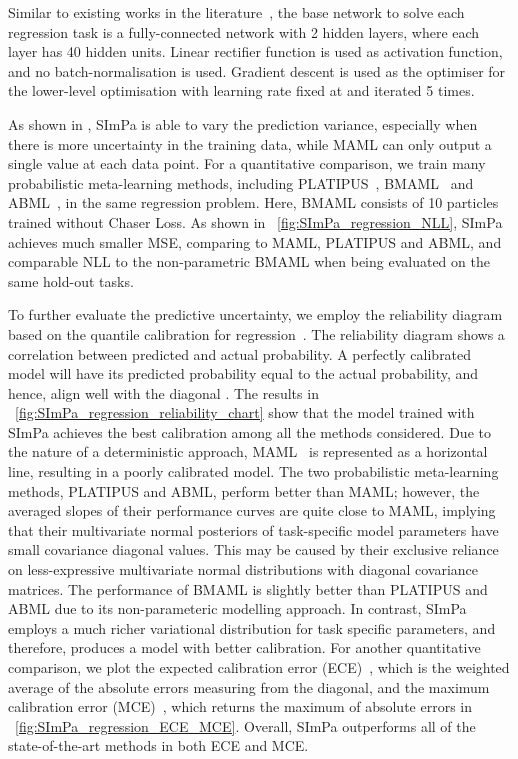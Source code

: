         Similar to existing works in the literature~\citep{finn2018probabilistic}, the base network to solve each regression task is a fully-connected network with 2 hidden layers, where each layer has 40 hidden units. Linear rectifier function is used as activation function, and no batch-normalisation is used. Gradient descent is used as the optimiser for the lower-level optimisation with learning rate fixed at  and iterated 5 times.
        
        As shown in \figureautorefname{~\ref{fig:regression_visualisation}}, SImPa is able to vary the prediction variance, especially when there is more uncertainty in the training data, while MAML can only output a single value at each data point. For a quantitative comparison, we train many probabilistic meta-learning methods, including PLATIPUS~\cite{finn2018probabilistic}, BMAML~\cite{yoon2018bayesian} and ABML~\cite{ravi2018amortized}, in the same regression problem. Here, BMAML consists of 10 particles trained without Chaser Loss. As shown in \figureautorefname~\ref{fig:SImPa_regression_NLL}, SImPa achieves much smaller MSE, comparing to MAML, PLATIPUS and ABML, and comparable NLL to the non-parametric BMAML when being evaluated on the same hold-out tasks.

        To further evaluate the predictive uncertainty, we employ the reliability diagram based on the quantile calibration for regression~\cite{song19distribution}. The reliability diagram shows a correlation between predicted and actual probability. A perfectly calibrated model will have its predicted probability equal to the actual probability, and hence, align well with the diagonal . The results in \figureautorefname~\ref{fig:SImPa_regression_reliability_chart} show that the model trained with SImPa achieves the best calibration among all the methods considered. Due to the nature of a deterministic approach, MAML~\cite{finn2017model} is represented as a horizontal line, resulting in a poorly calibrated model. The two probabilistic meta-learning methods, PLATIPUS and ABML, perform better than MAML; however, the averaged slopes of their performance curves are quite close to MAML, implying that their multivariate normal posteriors of task-specific model parameters have small covariance diagonal values. This may be caused by their exclusive reliance on less-expressive multivariate normal distributions with diagonal covariance matrices. The performance of BMAML is slightly better than PLATIPUS and ABML due to its non-parameteric modelling approach. In contrast, SImPa employs a much richer variational distribution  for task specific parameters, and therefore, produces a model with better calibration. For another quantitative comparison, we plot the expected calibration error (ECE)~\cite{guo2017oncalibration}, which is the weighted average of the absolute errors measuring from the diagonal, and the maximum calibration error (MCE)~\cite{guo2017oncalibration}, which returns the maximum of absolute errors in \figureautorefname~\ref{fig:SImPa_regression_ECE_MCE}. Overall, SImPa outperforms all of the state-of-the-art methods in both ECE and MCE.
        
